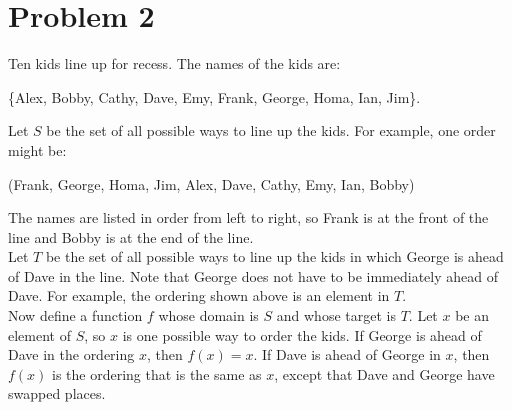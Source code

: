 \documentclass{amsart}
\theoremstyle{definition}
\theoremstyle{Exercise}
\theoremstyle{remark}
\theoremstyle{rule}
\numberwithin{equation}{section}
\begin{document}
\section*{Problem 2}
Ten kids line up for recess. The names of the kids are:\\
\begin{center}
 \{Alex, Bobby, Cathy, Dave, Emy, Frank, George, Homa, Ian, Jim\}.\\
\end{center}
Let $S$ be the set of all possible ways to line up the kids. For example, one order might be:
\begin{center}
  (Frank, George, Homa, Jim, Alex, Dave, Cathy, Emy, Ian, Bobby)\\
\end{center}
The names are listed in order from left to right, so Frank is at the front of the line and Bobby is at the end of the line.\\
Let $T$ be the set of all possible ways to line up the kids in which George is ahead of Dave in the line. Note that George does not have to be immediately ahead of Dave. For example, the ordering shown above is an element in $T$.\\
Now define a function $f$ whose domain is $S$ and whose target is $T$. Let $x$ be an element of $S$, so $x$ is one possible way to order the kids. If George is ahead of Dave in the ordering $x$, then $f(x) = x$. If Dave is ahead of George in $x$, then $f(x)$ is the ordering that is the same as $x$, except that Dave and George have swapped places.\\
\end{document}

